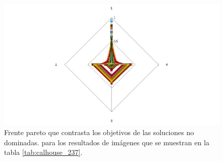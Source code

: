     \begin{figure}[H]
    \centering
    \includegraphics[width=\textwidth]{./Figures/calhouse_237/calhouse_237_2.jpg}
    \caption{Frente pareto que contrasta los objetivos de las soluciones no dominadas. para los resultados de imágenes que se muestran en la tabla \ref{tab:calhouse_237}.}
    \label{fig:calhouse2372fp}
    \end{figure}    



